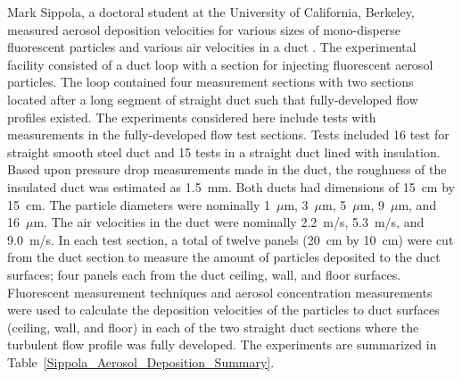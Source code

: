 Mark Sippola, a doctoral student at the University of California, Berkeley, measured aerosol deposition velocities for various sizes of mono-disperse fluorescent particles and various air velocities in a duct \cite{Sippola:2002,Sippola:2010}. The experimental facility consisted of a duct loop with a section for injecting fluorescent aerosol particles. The loop contained four measurement sections with two sections located after a long segment of straight duct such that fully-developed flow profiles existed. The experiments considered here include tests with measurements in the fully-developed flow test sections. Tests included 16 test for straight smooth steel duct and 15 tests in a straight duct lined with insulation. Based upon pressure drop measurements made in the duct, the roughness of the insulated duct was estimated as 1.5~mm. Both ducts had dimensions of 15~cm by 15~cm. The particle diameters were nominally 1~$\mu$m, 3~$\mu$m, 5~$\mu$m, 9~$\mu$m, and 16~$\mu$m. The air velocities in the duct were nominally 2.2~m/s, 5.3~m/s, and 9.0~m/s. In each test section, a total of twelve panels (20~cm by 10~cm) were cut from the duct section to measure the amount of particles deposited to the duct surfaces; four panels each from the duct ceiling, wall, and floor surfaces. Fluorescent measurement techniques and aerosol concentration measurements were used to calculate the deposition velocities of the particles to duct surfaces (ceiling, wall, and floor) in each of the two straight duct sections where the turbulent flow profile was fully developed. The experiments are summarized in Table~\ref{Sippola_Aerosol_Deposition_Summary}.

